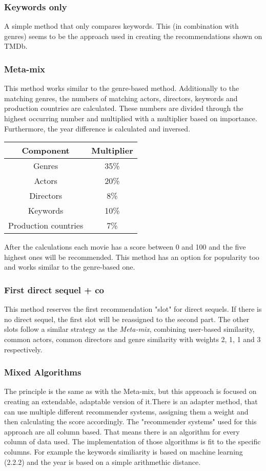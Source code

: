 \documentclass{article}
\begin{document}
\subsubsection{Keywords only}
A simple method that only compares keywords. This (in combination with genres) seems to be the approach used in creating the recommendations shown on TMDb.
\subsubsection{Meta-mix}
This method works similar to the genre-based method. Additionally to the matching genres, the numbers of matching actors, directors, keywords and production countries are calculated. These numbers are divided through the highest occurring number and multiplied with a multiplier based on importance. Furthermore, the year difference is calculated and inversed.
\begin{center}
 \begin{tabular}{||c c||} 
 \hline
 Component & Multiplier \\ [0.5ex] 
 \hline\hline
 Genres & 35\% \\ 
 \hline
 Actors & 20\% \\
 \hline
 Directors & 8\% \\
 \hline
 Keywords & 10\% \\
 \hline
 Production countries & 7\% \\ 
 \hline
\end{tabular}
\end{center}
After the calculations each movie has a score between 0 and 100 and the five highest ones will be recommended. This method has an option for popularity too and works similar to the genre-based one.
\subsubsection{First direct sequel + co}
This method reserves the first recommendation "slot" for direct sequels. If there is no direct sequel, the first slot will be reassigned to the second part. The other slots follow a similar strategy as the \emph{Meta-mix}, combining user-based similarity, common actors, common directors and genre similarity with weights 2, 1, 1 and 3 respectively.
\subsubsection{Mixed Algorithms}
The principle is the same as with the Meta-mix, but this approach is focused on creating an extendable, adaptable version of it.There is an adapter method, that can use multiple different recommender systems, assigning them a weight and then calculating the score accordingly.
The "recommender systems" used for this approach are all column based. That means there is an algorithm for every column of data used. The implementation of those algorithms is fit to the specific columns. For example the keywords similiarity is based on machine learning (2.2.2) and the year is based on a simple arithmethic distance.
\end{document}
